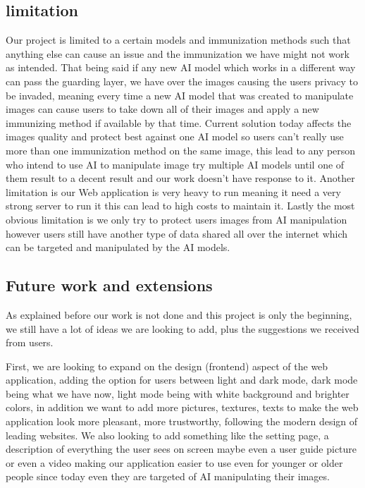 \documentclass[sigconf]{acmart}
\begin{document}
\subsection{limitation}

Our project is limited to a certain models and immunization methods such that anything else can cause an issue and the immunization we have might not work as intended. That being said if any new AI model which works in a different way can pass the guarding layer, we have over the images causing the users privacy to be invaded, meaning every time a new AI model that was created to manipulate images can cause users to take down all of their images and apply a new immunizing method if available by that time. Current solution today affects the images quality and protect best against one AI model so users can't really use more than one immunization method on the same image, this lead to any person who intend to use AI to manipulate image try multiple AI models until one of them result to a decent result and our work doesn't have response to it. Another limitation is our Web application is very heavy to run meaning it need a very strong server to run it this can lead to high costs to maintain it. Lastly the most obvious limitation is we only try to protect users images from AI manipulation however users still have another type of data shared all over the internet which can be targeted and manipulated by the AI models. 

\subsection{Future work and extensions}

As explained before our work is not done and this project is only the beginning, we still have a lot of ideas we are looking to add, plus the suggestions we received from users.   
 
First, we are looking to expand on the design (frontend) aspect of the web application, adding the option for users between light and dark mode, dark mode being what we have now, light mode being with white background and brighter colors, in addition we want to add more pictures, textures, texts to make the web application look more pleasant, more trustworthy, following the modern design of leading websites. We also looking to add something like the setting page, a description of everything the user sees on screen maybe even a user guide picture or even a video making our application easier to use even for younger or older people since today even they are targeted of AI manipulating their images.   
\end{document}
